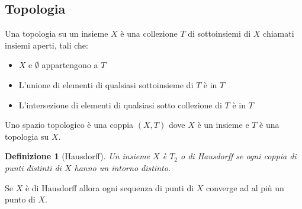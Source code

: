 \documentclass[a4paper, 12pt]{article}
\newtheorem{definition}{Definizione}
\begin{document}
\subsection{Topologia}
Una topologia su un insieme $X$ è una collezione $T$ di sottoinsiemi di $X$ chiamati insiemi aperti, tali che:
\begin{itemize}
    \item $X$ e $\emptyset$ appartengono a $T$
    \item L'unione di elementi di qualsiasi sottoinsieme di $T$ è in $T$
    \item L'intersezione di elementi di qualsiasi sotto collezione di $T$ è in $T$
\end{itemize}
Uno spazio topologico è una coppia $(X,T)$ dove $X$ è un insieme e $T$ è una topologia su $X$.
\begin{definition}[Hausdorff]
Un insieme $X$ è $T_2$ o di Hausdorff se ogni coppia di punti distinti di $X$ hanno un intorno distinto.
\end{definition}
Se $X$ è di Hausdorff allora ogni sequenza di punti di $X$ converge ad al più un punto di $X$.
\end{document}
